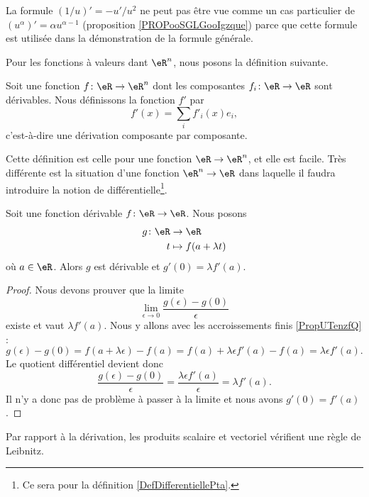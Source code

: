 \begin{remark}
	La formule \( (1/u)'=-u'/u^2\) ne peut pas être vue comme un cas particulier de \( (u^{\alpha})'=\alpha u^{\alpha-1}\) (proposition \ref{PROPooSGLGooIgzque}) parce que cette formule est utilisée dans la démonstration de la formule générale.
\end{remark}


Pour les fonctions à valeurs dant \( \eR^n\), nous posons la définition suivante.
\begin{definition}      \label{DEFooNEPUooWOMpyu}
	Soit une fonction \( f\colon \eR\to \eR^n\) dont les composantes \( f_i\colon \eR\to \eR\) sont dérivables. Nous définissons la fonction \( f'\) par
	\begin{equation}
		f'(x)=\sum_if'_i(x)e_i,
	\end{equation}
	c'est-à-dire une dérivation composante par composante.
\end{definition}

Cette définition est celle pour une fonction \( \eR\to \eR^n\), et elle est facile. Très différente est la situation d'une fonction \( \eR^n\to \eR\) dans laquelle il faudra introduire la notion de différentielle\footnote{Ce sera pour la définition \ref{DefDifferentiellePta}.}.

\begin{lemma}       \label{LEMooXHVBooHYjXdq}
	Soit une fonction dérivable \( f\colon \eR\to \eR\). Nous posons
	\begin{equation}
		\begin{aligned}
			g\colon \eR & \to \eR                \\
			t           & \mapsto f(a+\lambda t)
		\end{aligned}
	\end{equation}
	où \( a\in \eR\). Alors \( g\) est dérivable et \( g'(0)=\lambda  f'(a)\).
\end{lemma}

\begin{proof}
	Nous devons prouver que la limite
	\begin{equation}
		\lim_{\epsilon\to 0}\frac{ g(\epsilon)-g(0) }{ \epsilon }
	\end{equation}
	existe et vaut \( \lambda f'(a)\). Nous y allons avec les accroissements finis \ref{PropUTenzfQ} :
	\begin{equation}
		g(\epsilon)-g(0)=f(a+\lambda \epsilon)-f(a)=f(a)+\lambda \epsilon f'(a)-f(a)=\lambda\epsilon f'(a).
	\end{equation}
	Le quotient différentiel devient donc
	\begin{equation}
		\frac{ g(\epsilon)-g(0) }{ \epsilon }=\frac{ \lambda \epsilon f'(a) }{ \epsilon }=\lambda f'(a).
	\end{equation}
	Il n'y a donc pas de problème à passer à la limite et nous avons \( g'(0)=f'(a)\).
\end{proof}
Par rapport à la dérivation, les produits scalaire et vectoriel vérifient une règle de Leibnitz.

